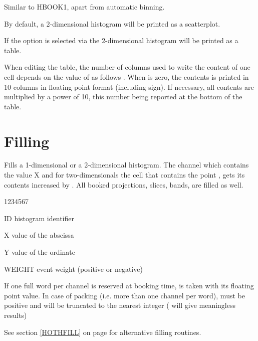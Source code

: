 \Remarks
\begin{UL}
\item Similar to HBOOK1, apart from automatic binning.
\item By default, a 2-dimensional histogram will be
      printed as a scatterplot.
\item If the option  is selected via
      the 2-dimensional histogram will be printed as a table.
\item When editing the table, the number of columns  used to
      write the content of one cell depends on the value of 
      as follows .
      When  is zero, the contents is printed in
      10 columns in floating point format (including sign). If
      necessary, all contents are multiplied by a power of 10,
      this number being reported at the bottom of the table.
\end{UL}


\section{Filling}
\label{HFILLSEC}


\Action 
Fills a 1-dimensional or a 2-dimensional histogram.
The channel which contains the value X and for two-dimensionals the cell that
contains the point , gets its contents increased by
.
All booked projections, slices, bands, are filled as well.

\Idesc
\begin{DLttc}{1234567}
\item[ID] histogram identifier
\item[X] value of the abscissa
\item[Y] value of the ordinate
\item[WEIGHT] event weight (positive or negative)
\end{DLttc}
\Remarks
\begin{UL}
\item If one full word per channel is reserved at booking time,
       is taken with its floating point value.
      In case of packing (i.e. more than one channel
      per word),  must be
      positive and will be truncated to the nearest integer
      ( will give meaningless results)
\item See section \ref{HOTHFILL} on page \pageref{HOTHFILL}
      for alternative filling routines.
\end{UL}
 
